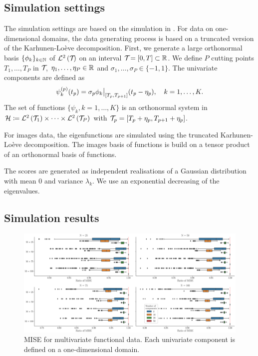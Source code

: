 \subsection{Simulation settings} %
\label{sub:simulation_settings}

The simulation settings are based on the simulation in \cite{happMultivariateFunctionalPrincipal2015}. For data on one-dimensional domains, the data generating process is based on a truncated version of the Karhunen-Loève decomposition. First, we generate a large orthonormal basis $\{\phi_k\}_{k \in \mathbb{N}}$ of $\mathcal{L}^{2}\left(\mathcal{T}_{}\right)$ on an interval $\mathcal{T}_{} = [0, T] \subset \mathbb{R}$. We define $P$ cutting points $T_1, \dots, T_P$ in $\mathcal{T}_{}$, $\eta_1, \dots, \eta_P \in \mathbb{R}$ and $\sigma_1, \dots, \sigma_P \in \{-1, 1\}$. The univariate components are defined as
\begin{equation}\label{eq:simulation_uni_component}
    \psi_k^{(p)}(t_p) = \sigma_p \restr{\phi_k}{[T_p, T_{p + 1}]}(t_p - \eta_p), \quad k = 1, \dots, K.
\end{equation}
The set of functions $\{\psi_k, k = 1, \dots, K\}$ is an orthonormal system in $\mathcal{H} \coloneqq \mathcal{L}^{2}\left(\mathcal{T}_{1}\right) \times \dots \times \mathcal{L}^{2}\left(\mathcal{T}_{P}\right)$ with $\mathcal{T}_{p} = [T_p + \eta_p, T_{p + 1} + \eta_p]$.

For images data, the eigenfunctions are simulated using the truncated Karhunen-Loève decomposition. The images basis of functions is build on a tensor product of an orthonormal basis of functions.

The scores are generated as independent realisations of a Gaussian distribution with mean $0$ and variance $\lambda_k$. We use an exponential decreasing of the eigenvalues.

\subsection{Simulation results} %
\label{sub:simulation_results}

\begin{figure}
    \centering
    \includegraphics[scale=0.25]{figures/mise_pall.eps}
    \caption{MISE for multivariate functional data. Each univariate component is defined on a one-dimensional domain.}
    \label{fig:mise_mfd_1d}
\end{figure}

